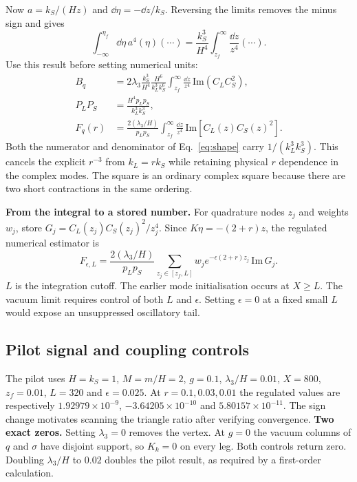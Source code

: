 Now $a=k_S/(Hz)$ and $\dd\eta=-\dd z/k_S$. Reversing the limits removes the minus sign and gives
\[
 \int_{-\infty}^{\eta_f}\dd\eta\,a^4(\eta)(\cdots)
 =\frac{k_S^3}{H^4}\int_{z_f}^\infty\frac{\dd z}{z^4}(\cdots).
\]
Use this result before setting numerical units:
\begin{align}
 B_q&=2\lambda_3\frac{k_S^3}{H^4}\frac{H^6}{k_L^3 k_S^6}
 \int_{z_f}^\infty\frac{\dd z}{z^4}\,\mathrm{Im}(C_L C_S^2),\nonumber\\
 P_LP_S&=\frac{H^4p_Lp_S}{k_L^3 k_S^3},\nonumber\\
 F_q(r)&=\frac{2(\lambda_3/H)}{p_Lp_S}\int_{z_f}^\infty\frac{\dd z}{z^4}\,
 \mathrm{Im}\!\left[C_L(z)C_S(z)^2\right].
\end{align}
Both the numerator and denominator of Eq.~\eqref{eq:shape} carry $1/(k_L^3k_S^3)$. This cancels the explicit $r^{-3}$ from $k_L=r k_S$ while retaining physical $r$ dependence in the complex modes. The square is an ordinary complex square because there are two short contractions in the same ordering.

\textbf{From the integral to a stored number.} For quadrature nodes $z_j$ and weights $w_j$, store $G_j=C_L(z_j)C_S(z_j)^2/z_j^4$. Since $K\eta=-(2+r)z$, the regulated numerical estimator is
\begin{equation}
 F_{\epsilon,L}=\frac{2(\lambda_3/H)}{p_Lp_S}\sum_{z_j\in[z_f,L]} w_j e^{-\epsilon(2+r)z_j}\,\mathrm{Im}\,G_j .
\end{equation}
$L$ is the integration cutoff. The earlier mode initialisation occurs at $X\ge L$. The vacuum limit requires control of both $L$ and $\epsilon$. Setting $\epsilon=0$ at a fixed small $L$ would expose an unsuppressed oscillatory tail.

\clearpage
\subsection{Pilot signal and coupling controls}
The pilot uses $H=k_S=1$, $M=m/H=2$, $g=0.1$, $\lambda_3/H=0.01$, $X=800$, $z_f=0.01$, $L=320$ and $\epsilon=0.025$. At $r=0.1,0.03,0.01$ the regulated values are respectively $1.92979\times10^{-9}$, $-3.64205\times10^{-10}$ and $5.80157\times10^{-11}$. The sign change motivates scanning the triangle ratio after verifying convergence.
\textbf{Two exact zeros.} Setting $\lambda_3=0$ removes the vertex. At $g=0$ the vacuum columns of $q$ and $\sigma$ have disjoint support, so $K_k=0$ on every leg. Both controls return zero. Doubling $\lambda_3/H$ to $0.02$ doubles the pilot result, as required by a first-order calculation.

